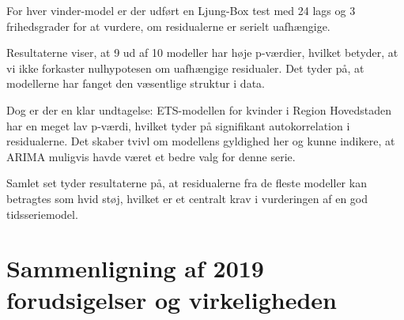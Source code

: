 \documentclass[
]{article}
\begin{document}
For hver vinder-model er der udført en Ljung-Box test med 24 lags og 3
frihedsgrader for at vurdere, om residualerne er serielt uafhængige.

Resultaterne viser, at 9 ud af 10 modeller har høje p-værdier, hvilket
betyder, at vi ikke forkaster nulhypotesen om uafhængige residualer. Det
tyder på, at modellerne har fanget den væsentlige struktur i data.

Dog er der en klar undtagelse: ETS-modellen for kvinder i Region
Hovedstaden har en meget lav p-værdi, hvilket tyder på signifikant
autokorrelation i residualerne. Det skaber tvivl om modellens gyldighed
her og kunne indikere, at ARIMA muligvis havde været et bedre valg for
denne serie.

Samlet set tyder resultaterne på, at residualerne fra de fleste modeller
kan betragtes som hvid støj, hvilket er et centralt krav i vurderingen
af en god tidsseriemodel.

\section{Sammenligning af 2019 forudsigelser og
virkeligheden}\label{sammenligning-af-2019-forudsigelser-og-virkeligheden}
\end{document}
